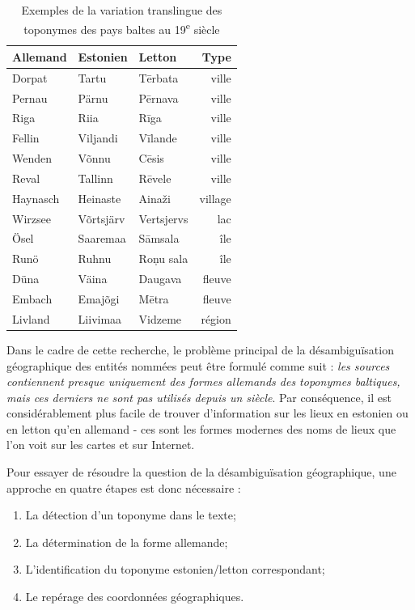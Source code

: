 \documentclass[a4paper,twoside,12pt]{article}
\begin{document}
\begin{table}[h]
    \centering
    \begin{tabular}{|l|l|l|r|}
    \hline
    \textbf{Allemand} & \textbf{Estonien} & \textbf{Letton} & \textbf{Type}\\
    \hline
    Dorpat & Tartu & Tērbata & ville\\
    Pernau & Pärnu & Pērnava & ville\\
    Riga & Riia & Rīga & ville\\
    Fellin & Viljandi & Vīlande & ville\\
    Wenden & Võnnu & Cēsis & ville\\
    Reval & Tallinn & Rēvele & ville\\
    Haynasch & Heinaste & Ainaži & village\\
    Wirzsee & Võrtsjärv & Vertsjervs & lac\\
    Ösel & Saaremaa & Sāmsala & île\\
    Runö & Ruhnu & Roņu sala & île\\
    Düna & Väina & Daugava & fleuve\\
    Embach & Emajõgi & Mētra & fleuve\\
    Livland & Liivimaa & Vidzeme & région\\
    \hline
\end{tabular}
    \caption{Exemples de la variation translingue des toponymes des pays baltes au 19\textsuperscript{e} siècle}
    \label{tab:placenames}
\end{table}

Dans le cadre de cette recherche, le problème principal de la désambiguïsation géographique des entités nommées peut être formulé comme suit : \textit{les sources contiennent presque uniquement des formes allemands des toponymes baltiques, mais ces derniers ne sont pas utilisés depuis un siècle}. Par conséquence, il est considérablement plus facile de trouver d'information sur les lieux en estonien ou en letton qu'en allemand - ces sont les formes modernes des noms de lieux que l'on voit sur les cartes et sur Internet.

Pour essayer de résoudre la question de la désambiguïsation géographique, une approche en quatre étapes est donc nécessaire :
\vspace{1ex}
\begin{enumerate}
    \item La détection d'un toponyme dans le texte;
    \item La détermination de la forme allemande;
    \item L'identification du toponyme estonien/letton correspondant;
    \item Le repérage des coordonnées géographiques.
\end{enumerate}
\vspace{1ex}
\end{document}
